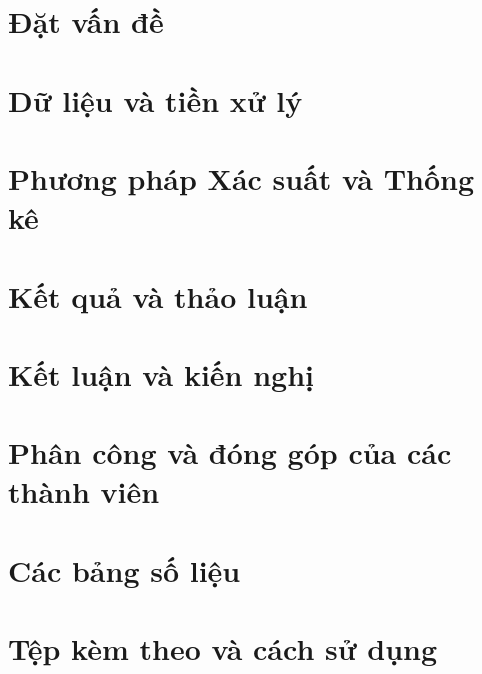 \documentclass[13pt,a4paper,oneside]{extreport}
\begin{document}

\tableofcontents
\clearpage
\listoffigures
\clearpage
\listoftables
\clearpage
{}

\chapter{Đặt vấn đề}


\chapter{Dữ liệu và tiền xử lý}



\chapter{Phương pháp Xác suất và Thống kê}








\chapter{Kết quả và thảo luận}









\chapter{Kết luận và kiến nghị}


\printbibliography[heading=bibintoc,title={Tài liệu tham khảo}]
\appendix
\chapter{Phân công và đóng góp của các thành viên}

\chapter{Các bảng số liệu}

\chapter{Tệp kèm theo và cách sử dụng}

\end{document}
